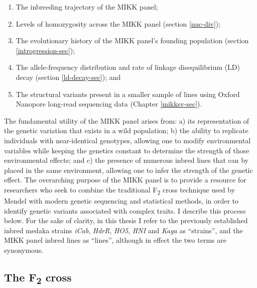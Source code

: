 \documentclass[
]{book}
\begin{document}
\begin{enumerate}
\def\labelenumi{\arabic{enumi}.}
\item
  The inbreeding trajectory of the MIKK panel;
\item
  Levels of homozygosity across the MIKK panel (section \ref{nuc-div});
\item
  The evolutionary history of the MIKK panel's founding population (section \ref{introgression-sec});
\item
  The allele-frequency distribution and rate of linkage disequilibrium (LD) decay (section \ref{ld-decay-sec}); and
\item
  The structural variants present in a smaller sample of lines using Oxford Nanopore long-read sequencing data (Chapter \ref{mikksv-sec}).
\end{enumerate}

The fundamental utility of the MIKK panel arises from: a) its representation of the genetic variation that exists in a wild population; b) the ability to replicate individuals with near-identical genotypes, allowing one to modify environmental variables while keeping the genetics constant to determine the strength of those environmental effects; and c) the presence of numerous inbred lines that can by placed in the same environment, allowing one to infer the strength of the genetic effect. The overarching purpose of the MIKK panel is to provide a resource for researchers who seek to combine the traditional F\textsubscript{2} cross technique used by Mendel with modern genetic sequencing and statistical methods, in order to identify genetic variants associated with complex traits. I describe this process below. For the sake of clarity, in this thesis I refer to the previously established inbred medaka strains \emph{iCab}, \emph{HdrR}, \emph{HO5}, \emph{HNI} and \emph{Kaga} as ``strains'', and the MIKK panel inbred lines as ``lines'', although in effect the two terms are synonymous.

\hypertarget{the-f2-cross}{%
\subsection{\texorpdfstring{The F\textsubscript{2} cross}{The F2 cross}}\label{the-f2-cross}}
\end{document}
